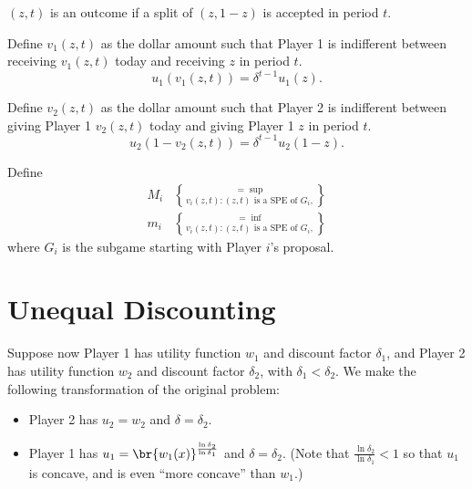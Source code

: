 {  $(z,t)$ is an outcome if a split of $(z,1-z)$ is accepted in period $t$.

  Define $v_1(z,t)$ as the dollar amount such that Player 1 is indifferent between receiving $v_1(z,t)$ today and receiving $z$ in period $t$. 
  \[
  u_1(v_1(z,t)) = \delta^{t-1} u_1(z).
  \]
  
  Define $v_2(z,t)$ as the dollar amount such that Player 2 is indifferent between giving Player 1 $v_2(z,t)$ today and giving Player 1 $z$ in period $t$. 
  \[
  u_2(1-v_2(z,t)) = \delta^{t-1} u_2(1-z).
  \]

  Define 
  \[
  \begin{aligned}
    M_i & = \sup\brace{v_i(z,t): (z,t) \text{ is a SPE of }G_i},\\
    m_i & = \inf\brace{v_i(z,t): (z,t) \text{ is a SPE of }G_i},
  \end{aligned}
  \]
  where $G_i$ is the subgame starting with Player $i$'s proposal.

}

\section{Unequal Discounting}

Suppose now Player 1 has utility function $w_1$ and discount factor $\delta_1$, and Player 2 has utility function $w_2$ and discount factor $\delta_2$, with $\delta_1 < \delta_2$. We make the following transformation of the original problem:
\begin{itemize}
  \item Player 2 has $u_2 = w_2$ and $\delta = \delta_2$.
  \item Player 1 has $u_1 = \br{w_1(x)}^{\frac{\ln \delta_2}{\ln \delta_1}}$ and $\delta  = \delta_2$. (Note that $\frac{\ln \delta_2}{\ln \delta_1} < 1$ so that $u_1$ is concave, and is even ``more concave'' than $w_1$.)
\end{itemize}

